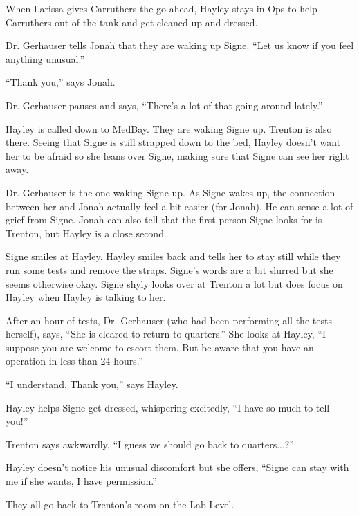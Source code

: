 When Larissa gives Carruthers the go ahead, Hayley stays in Ops to help Carruthers out of the tank and get cleaned up and dressed.  





Dr. Gerhauser tells Jonah that they are waking up Signe. ``Let us know if you feel anything unusual.''

``Thank you,'' says Jonah.

Dr. Gerhauser pauses and says, ``There's a lot of that going around lately.''



Hayley is called down to MedBay.  They are waking Signe up.  Trenton is also there.  Seeing that Signe is still strapped down to the bed, Hayley doesn't want her to be afraid so she leans over Signe, making sure that Signe can see her right away.



Dr. Gerhauser is the one waking Signe up.  As Signe wakes up, the connection between her and Jonah actually feel a bit easier (for Jonah).  He can sense a lot of grief from Signe.  Jonah can also tell that the first person Signe looks for is Trenton, but Hayley is a close second.  



Signe smiles at Hayley.  Hayley smiles back and tells her to stay still while they run some tests and remove the straps.  Signe's words are a bit slurred but she seems otherwise okay.  Signe shyly looks over at Trenton a lot but does focus on Hayley when Hayley is talking to her.



After an hour of tests, Dr. Gerhauser (who had been performing all the tests herself), says, ``She is cleared to return to quarters.''  She looks at Hayley, ``I suppose you are welcome to escort them.  But be aware that you have an operation in less than 24 hours.''

``I understand.  Thank you,'' says Hayley.



Hayley helps Signe get dressed, whispering excitedly, ``I have so much to tell you!'' 

Trenton says awkwardly, ``I guess we should go back to quarters...?'' 

Hayley doesn't notice his unusual discomfort but she offers, ``Signe can stay with me if she wants, I have permission.''

They all go back to Trenton's room on the Lab Level.  

